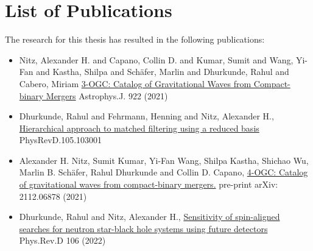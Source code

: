 \chapter{List of Publications}\label{app:publications}
The research for this thesis has resulted in the following publications:
\begin{itemize}
	\item[\cite{Nitz:2021uxj}] Nitz, Alexander H. and Capano, Collin D. and Kumar, Sumit and Wang, Yi-Fan and Kastha, Shilpa and Sch\"afer, Marlin and Dhurkunde, Rahul and Cabero, Miriam \href{https://iopscience.iop.org/article/10.3847/1538-4357/ac1c03}{3-OGC: Catalog of Gravitational Waves from Compact-binary Mergers} Astrophys.J. 922 (2021)

	\item[\cite{Dhurkunde:2021csz}] Dhurkunde, Rahul and Fehrmann, Henning and Nitz, Alexander H., \href{https://journals.aps.org/prd/abstract/10.1103/PhysRevD.105.103001}{Hierarchical approach to matched filtering using a reduced basis} PhysRevD.105.103001
 
	\item[\cite{Nitz:2021zwj}] Alexander H. Nitz, Sumit Kumar, Yi-Fan Wang, Shilpa Kastha, Shichao Wu, Marlin B. Schäfer, Rahul Dhurkunde and Collin D. Capano, \href{http://arxiv.org/abs/2112.06878}{4-OGC: Catalog of gravitational waves from compact-binary mergers.} pre-print arXiv: 2112.06878 (2021)
 
	\item[\cite{Dhurkunde:2022aek}] Dhurkunde, Rahul and Nitz, Alexander H., \href{https://journals.aps.org/prd/abstract/10.1103/PhysRevD.106.103035}{Sensitivity of spin-aligned searches for neutron star-black hole systems using future detectors} Phys.Rev.D 106 (2022) 
 
\end{itemize}